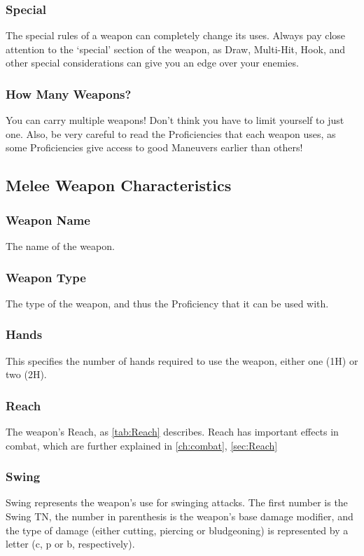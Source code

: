 \documentclass[oneside,11pt,english]{book}
\begin{document}
\subsubsection{Special}
The special rules of a weapon can completely change its uses. Always pay close attention to the ‘special’ section of the
weapon, as Draw, Multi-Hit, Hook, and other special considerations can give you an edge over your enemies.

\subsubsection{How Many Weapons?}
You can carry multiple weapons! Don’t think you have to limit yourself to just one. Also, be very careful to read the 
Proficiencies that each weapon uses, as some Proficiencies give access to good Maneuvers earlier than others!

\subsection{Melee Weapon Characteristics} %
\subsubsection{Weapon Name}
The name of the weapon.
\subsubsection{Weapon Type}
The type of the weapon, and thus the Proficiency that it can be used with.
\subsubsection{Hands}
This specifies the number of hands required to use the weapon, either one (1H) or two (2H). 
\subsubsection{Reach}
The weapon’s Reach, as \autoref{tab:Reach} describes. Reach has important effects in combat, which are further explained in \autoref{ch:combat}, \autoref{sec:Reach}

\subsubsection{Swing}
Swing represents the weapon’s use for swinging attacks. The first number is the Swing TN, the number in parenthesis 
is the weapon’s base damage modifier, and the type of damage (either cutting, piercing or bludgeoning) is represented 
by a letter (c, p or b, respectively). 
\end{document}
